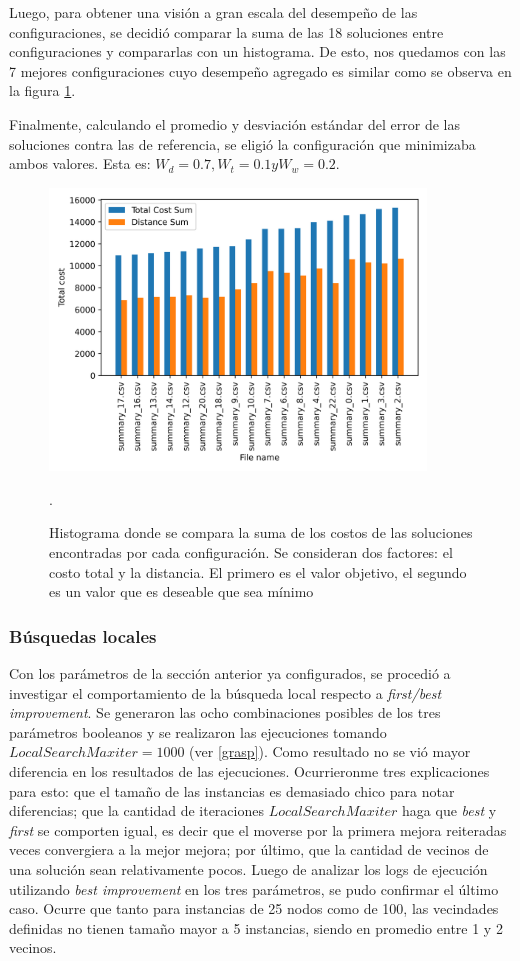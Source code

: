 \documentclass{article}
\begin{document}
  Luego, para obtener una visión a gran escala del desempeño de las configuraciones, se decidió comparar la suma de las 18 soluciones entre configuraciones y compararlas con un histograma. De esto, nos quedamos con las 7 mejores configuraciones cuyo desempeño agregado es similar como se observa en la figura \ref{cmphistogram}.

  Finalmente, calculando el promedio y desviación estándar del error de las soluciones contra las de referencia, se eligió la configuración que minimizaba ambos valores. Esta es: $W_d = 0.7, W_t = 0.1 y W_w = 0.2$.

  \begin{figure}
    \centering
    \includegraphics[width=10cm]{resources/tunning/total_cost_histogram_used.png}
    \caption{Histograma donde se compara la suma de los costos de las soluciones encontradas por cada configuración. Se consideran dos factores: el costo total y la distancia. El primero es el valor objetivo, el segundo es un valor que es deseable que sea mínimo}.
    \label{cmphistogram}
  \end{figure}

  \subsubsection*{Búsquedas locales}

  Con los parámetros de la sección anterior ya configurados, se procedió a investigar el comportamiento de la búsqueda local respecto a {\it first/best improvement}. Se generaron las ocho combinaciones posibles de los tres parámetros booleanos y se realizaron las ejecuciones tomando $LocalSearchMaxiter = 1000$ (ver \ref{grasp}). Como resultado no se vió mayor diferencia en los resultados de las ejecuciones. Ocurrieronme tres explicaciones para esto: que el tamaño de las instancias es demasiado chico para notar diferencias; que la cantidad de iteraciones $LocalSearchMaxiter$ haga que {\it best} y {\it first} se comporten igual, es decir que el moverse por la primera mejora reiteradas veces convergiera a la mejor mejora; por último, que la cantidad de vecinos de una solución sean relativamente pocos. Luego de analizar los logs de ejecución utilizando {\it best improvement} en los tres parámetros, se pudo confirmar el último caso. Ocurre que tanto para instancias de 25 nodos como de 100, las vecindades definidas no tienen tamaño mayor a 5 instancias, siendo en promedio entre 1 y 2 vecinos.
  
\end{document}
